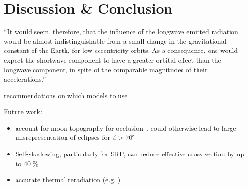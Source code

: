 \section{Discussion \& Conclusion}

\enquote{It would seem, therefore,
that the influence of the longwave emitted radiation would be almost
indistinguishable from a small change in the gravitational constant of the Earth, for
low eccentricity orbits.
As a consequence, one would expect the shortwave
component to have a greater orbital effect than the longwave component, in spite of
the comparable magnitudes of their accelerations.}~\cite{Knocke1989}


recommendations on which models to use


Future work:
\begin{itemize}
    \item account for moon topography for occlusion~\cite{Mazarico2018}, could otherwise lead to large misrepresentation of eclipses for $\beta > \ang{70}$
    \item Self-shadowing, particularly for SRP, can reduce effective cross section by up to 40
    \%~\cite{Mazarico2018}
    \item accurate thermal reradiation (e.g. \cite{Marshall1994})
\end{itemize}


